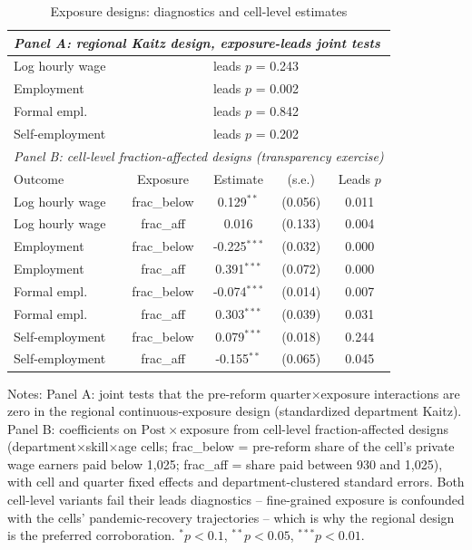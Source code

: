 \begin{table}[H]\centering
\caption{Exposure designs: diagnostics and cell-level estimates}\label{tab:expocells}
\begin{threeparttable}
\footnotesize
\begin{tabular}{lcccc}
\toprule
\multicolumn{5}{l}{\emph{Panel A: regional Kaitz design, exposure-leads joint tests}}\\
\midrule
Log hourly wage & \multicolumn{4}{c}{leads $p$ = 0.243} \\
Employment & \multicolumn{4}{c}{leads $p$ = 0.002} \\
Formal empl. & \multicolumn{4}{c}{leads $p$ = 0.842} \\
Self-employment & \multicolumn{4}{c}{leads $p$ = 0.202} \\
\midrule
\multicolumn{5}{l}{\emph{Panel B: cell-level fraction-affected designs (transparency exercise)}}\\
Outcome & Exposure & Estimate & (s.e.) & Leads $p$ \\ \midrule
Log hourly wage & frac\_below & 0.129$^{**}$ & (0.056) & 0.011 \\
Log hourly wage & frac\_aff & 0.016 & (0.133) & 0.004 \\
Employment & frac\_below & -0.225$^{***}$ & (0.032) & 0.000 \\
Employment & frac\_aff & 0.391$^{***}$ & (0.072) & 0.000 \\
Formal empl. & frac\_below & -0.074$^{***}$ & (0.014) & 0.007 \\
Formal empl. & frac\_aff & 0.303$^{***}$ & (0.039) & 0.031 \\
Self-employment & frac\_below & 0.079$^{***}$ & (0.018) & 0.244 \\
Self-employment & frac\_aff & -0.155$^{**}$ & (0.065) & 0.045 \\
\bottomrule
\end{tabular}
\begin{tablenotes}\footnotesize
\item Notes: Panel A: joint tests that the pre-reform quarter$\times$exposure interactions are zero in the regional continuous-exposure design (standardized department Kaitz). Panel B: coefficients on $\mathrm{Post}\times$exposure from cell-level fraction-affected designs (department$\times$skill$\times$age cells; frac\_below = pre-reform share of the cell's private wage earners paid below 1{,}025; frac\_aff = share paid between 930 and 1{,}025), with cell and quarter fixed effects and department-clustered standard errors. Both cell-level variants fail their leads diagnostics -- fine-grained exposure is confounded with the cells' pandemic-recovery trajectories -- which is why the regional design is the preferred corroboration. $^{*}p<0.1$, $^{**}p<0.05$, $^{***}p<0.01$.
\end{tablenotes}
\end{threeparttable}\end{table}
